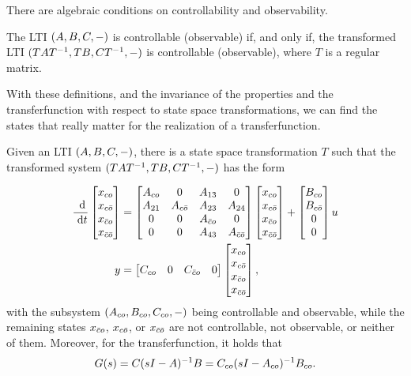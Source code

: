There are algebraic conditions on controllability and observability.

\begin{theorem}
	The LTI $(A,B,C,-)$ is controllable (observable) if, and only if, the transformed LTI $(TAT^{-1},TB,CT^{-1},-)$ is controllable (observable), where $T$ is a regular matrix.
\end{theorem}

With these definitions, and the invariance of the properties and the transferfunction with respect to state space transformations, we can find the states that really matter for the realization of a transferfunction.

\begin{theorem}
	Given an LTI $(A,B,C,-)$, there is a state space transformation $T$ such that the transformed system $(TAT^{-1},TB,CT^{-1},-)$ has the form 

	\begin{align*}
		\frac {\text{~\textup{d}}}{\text{~\textup{d}} t}
		\begin{bmatrix} x_{co} \\ x_{c\bar o} \\ x_{\bar c o} \\ x_{\bar c \bar o} \end{bmatrix} 
			&= 
		\begin{bmatrix}
			A_{co} & 0 & A_{13} & 0 \\
			A_{21} & A_{c \bar o} & A_{23} & A_{24} \\
			0 & 0 & A_{\bar c o} & 0 \\
			0 & 0 & A_{43} & A_{\bar c \bar o} 
		\end{bmatrix}
		\begin{bmatrix} x_{co} \\ x_{c\bar o} \\ x_{\bar c o} \\ x_{\bar c \bar o} \end{bmatrix}
			+
		\begin{bmatrix} B_{co} \\ B_{c \bar o} \\ 0 \\ 0 \end{bmatrix} u \\
			y &= 
			\begin{bmatrix} C_{co} & 0 & C_{\bar c o} & 0 \end{bmatrix}
		\begin{bmatrix} x_{co} \\ x_{c\bar o} \\ x_{\bar c o} \\ x_{\bar c \bar o} \end{bmatrix},
	\end{align*}
	with the subsystem $(A_{co}, B_{co}, C_{co}, -)$ being controllable and observable, while the remaining states $x_{\bar c o}$, $x_{c \bar o}$, or $x_{\bar c \bar o}$ are not controllable, not observable, or neither of them.
	Moreover, for the transferfunction, it holds that
	\begin{equation*}
		G(s) = C(sI-A)^{-1}B = C_{co}(sI-A_{co})^{-1}B_{co}.
	\end{equation*}
\end{theorem}

